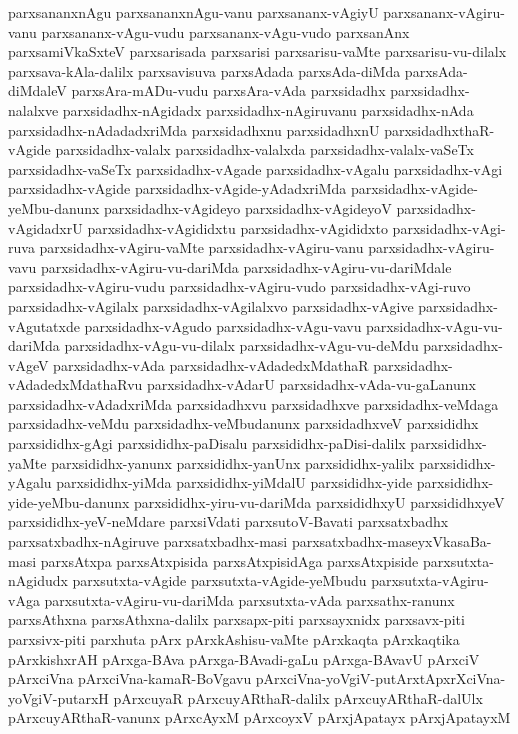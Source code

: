{parxsananxnAgu
parxsananxnAgu-vanu
parxsananx-vAgiyU
parxsananx-vAgiru-vanu
parxsananx-vAgu-vudu
parxsananx-vAgu-vudo
parxsanAnx
parxsamiVkaSxteV
parxsarisada
parxsarisi
parxsarisu-vaMte
parxsarisu-vu-dilalx
parxsava-kAla-dalilx
parxsavisuva
parxsAdada
parxsAda-diMda
parxsAda-diMdaleV
parxsAra-mADu-vudu
parxsAra-vAda
parxsidadhx
parxsidadhx-nalalxve
parxsidadhx-nAgidadx
parxsidadhx-nAgiruvanu
parxsidadhx-nAda
parxsidadhx-nAdadadxriMda
parxsidadhxnu
parxsidadhxnU
parxsidadhxthaR-vAgide
parxsidadhx-valalx
parxsidadhx-valalxda
parxsidadhx-valalx-vaSeTx
parxsidadhx-vaSeTx
parxsidadhx-vAgade
parxsidadhx-vAgalu
parxsidadhx-vAgi
parxsidadhx-vAgide
parxsidadhx-vAgide-yAdadxriMda
parxsidadhx-vAgide-yeMbu-danunx
parxsidadhx-vAgideyo
parxsidadhx-vAgideyoV
parxsidadhx-vAgidadxrU
parxsidadhx-vAgididxtu
parxsidadhx-vAgididxto
parxsidadhx-vAgi-ruva
parxsidadhx-vAgiru-vaMte
parxsidadhx-vAgiru-vanu
parxsidadhx-vAgiru-vavu
parxsidadhx-vAgiru-vu-dariMda
parxsidadhx-vAgiru-vu-dariMdale
parxsidadhx-vAgiru-vudu
parxsidadhx-vAgiru-vudo
parxsidadhx-vAgi-ruvo
parxsidadhx-vAgilalx
parxsidadhx-vAgilalxvo
parxsidadhx-vAgive
parxsidadhx-vAgutatxde
parxsidadhx-vAgudo
parxsidadhx-vAgu-vavu
parxsidadhx-vAgu-vu-dariMda
parxsidadhx-vAgu-vu-dilalx
parxsidadhx-vAgu-vu-deMdu
parxsidadhx-vAgeV
parxsidadhx-vAda
parxsidadhx-vAdadedxMdathaR
parxsidadhx-vAdadedxMdathaRvu
parxsidadhx-vAdarU
parxsidadhx-vAda-vu-gaLanunx
parxsidadhx-vAdadxriMda
parxsidadhxvu
parxsidadhxve
parxsidadhx-veMdaga
parxsidadhx-veMdu
parxsidadhx-veMbudanunx
parxsidadhxveV
parxsididhx
parxsididhx-gAgi
parxsididhx-paDisalu
parxsididhx-paDisi-dalilx
parxsididhx-yaMte
parxsididhx-yanunx
parxsididhx-yanUnx
parxsididhx-yalilx
parxsididhx-yAgalu
parxsididhx-yiMda
parxsididhx-yiMdalU
parxsididhx-yide
parxsididhx-yide-yeMbu-danunx
parxsididhx-yiru-vu-dariMda
parxsididhxyU
parxsididhxyeV
parxsididhx-yeV-neMdare
parxsiVdati
parxsutoV-Bavati
parxsatxbadhx
parxsatxbadhx-nAgiruve
parxsatxbadhx-masi
parxsatxbadhx-maseyxVkasaBa-masi
parxsAtxpa
parxsAtxpisida
parxsAtxpisidAga
parxsAtxpiside
parxsutxta-nAgidudx
parxsutxta-vAgide
parxsutxta-vAgide-yeMbudu
parxsutxta-vAgiru-vAga
parxsutxta-vAgiru-vu-dariMda
parxsutxta-vAda
parxsathx-ranunx
parxsAthxna
parxsAthxna-dalilx
parxsapx-piti
parxsayxnidx
parxsavx-piti
parxsivx-piti
parxhuta
pArx
pArxkAshisu-vaMte
pArxkaqta
pArxkaqtika
pArxkishxrAH
pArxga-BAva
pArxga-BAvadi-gaLu
pArxga-BAvavU
pArxciV
pArxciVna
pArxciVna-kamaR-BoVgavu
pArxciVna-yoVgiV-putArxtApxrXciVna-yoVgiV-putarxH
pArxcuyaR
pArxcuyARthaR-dalilx
pArxcuyARthaR-dalUlx
pArxcuyARthaR-vanunx
pArxcAyxM
pArxcoyxV
pArxjApatayx
pArxjApatayxM
}
